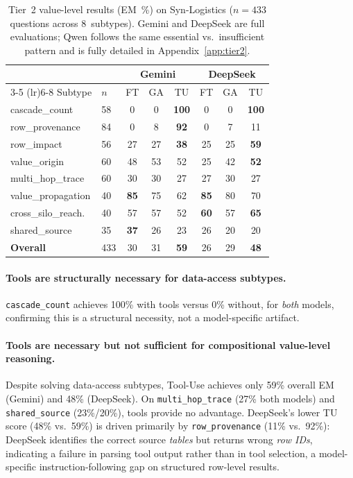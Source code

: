\begin{table}[t]
\centering
\caption{Tier~2 value-level results (EM~\%) on Syn-Logistics
($n{=}433$ questions across 8~subtypes).  Gemini and DeepSeek are
full evaluations; Qwen follows the same essential vs.\ insufficient
pattern and is fully detailed in Appendix~\ref{app:tier2}.}
\label{tab:tier2}
\small
\begin{tabular}{llcccccc}
\toprule
 & & \multicolumn{3}{c}{Gemini} & \multicolumn{3}{c}{DeepSeek} \\
\cmidrule(lr){3-5} \cmidrule(lr){6-8}
Subtype & $n$ & FT & GA & TU & FT & GA & TU \\
\midrule
cascade\_count      & 58  & 0   & 0   & \textbf{100} & 0   & 0   & \textbf{100} \\
row\_provenance     & 84  & 0   & 8   & \textbf{92}  & 0   & 7   & 11 \\
row\_impact         & 56  & 27  & 27  & \textbf{38}  & 25  & 25  & \textbf{59} \\
value\_origin       & 60  & 48  & 53  & 52           & 25  & 42  & \textbf{52} \\
multi\_hop\_trace   & 60  & 30  & 30  & 27           & 27  & 30  & 27 \\
value\_propagation  & 40  & \textbf{85} & 75  & 62   & \textbf{85} & 80  & 70 \\
cross\_silo\_reach. & 40  & 57  & 57  & 52           & \textbf{60} & 57  & \textbf{65} \\
shared\_source      & 35  & \textbf{37} & 26  & 23   & 26  & 20  & 20 \\
\midrule
\textbf{Overall}    & 433 & 30  & 31  & \textbf{59}  & 26  & 29  & \textbf{48} \\
\bottomrule
\end{tabular}
\end{table}

\paragraph{Tools are structurally necessary for data-access subtypes.}
\texttt{cascade\_count} achieves 100\% with tools versus 0\% without,
for \emph{both} models, confirming this is a structural necessity,
not a model-specific artifact.

\paragraph{Tools are necessary but not sufficient for compositional value-level reasoning.}
Despite solving data-access subtypes, Tool-Use achieves only 59\%
overall EM (Gemini) and 48\% (DeepSeek).  On \texttt{multi\_hop\_trace}
(27\% both models) and \texttt{shared\_source} (23\%/20\%), tools
provide no advantage.  DeepSeek's lower TU score (48\% vs.\ 59\%)
is driven primarily by \texttt{row\_provenance} (11\% vs.\ 92\%):
DeepSeek identifies the correct source \emph{tables} but returns
wrong \emph{row IDs}, indicating a failure in parsing tool output
rather than in tool selection, a model-specific instruction-following
gap on structured row-level results.

